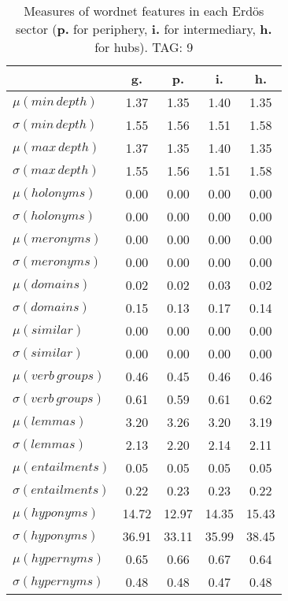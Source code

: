\begin{table}[h!]
\begin{center}
\begin{tabular}{| l | c | c | c | c |}\hline
 & g. & p. & i. & h. \\\hline
$\mu(min\,depth)$ & 1.37  & 1.35  & 1.40  & 1.35 \\\hline
$\sigma(min\,depth)$ & 1.55  & 1.56  & 1.51  & 1.58 \\\hline
$\mu(max\,depth)$ & 1.37  & 1.35  & 1.40  & 1.35 \\\hline
$\sigma(max\,depth)$ & 1.55  & 1.56  & 1.51  & 1.58 \\\hline
$\mu(holonyms)$ & 0.00  & 0.00  & 0.00  & 0.00 \\\hline
$\sigma(holonyms)$ & 0.00  & 0.00  & 0.00  & 0.00 \\\hline
$\mu(meronyms)$ & 0.00  & 0.00  & 0.00  & 0.00 \\\hline
$\sigma(meronyms)$ & 0.00  & 0.00  & 0.00  & 0.00 \\\hline
$\mu(domains)$ & 0.02  & 0.02  & 0.03  & 0.02 \\\hline
$\sigma(domains)$ & 0.15  & 0.13  & 0.17  & 0.14 \\\hline
$\mu(similar)$ & 0.00  & 0.00  & 0.00  & 0.00 \\\hline
$\sigma(similar)$ & 0.00  & 0.00  & 0.00  & 0.00 \\\hline
$\mu(verb\,groups)$ & 0.46  & 0.45  & 0.46  & 0.46 \\\hline
$\sigma(verb\,groups)$ & 0.61  & 0.59  & 0.61  & 0.62 \\\hline
$\mu(lemmas)$ & 3.20  & 3.26  & 3.20  & 3.19 \\\hline
$\sigma(lemmas)$ & 2.13  & 2.20  & 2.14  & 2.11 \\\hline
$\mu(entailments)$ & 0.05  & 0.05  & 0.05  & 0.05 \\\hline
$\sigma(entailments)$ & 0.22  & 0.23  & 0.23  & 0.22 \\\hline
$\mu(hyponyms)$ & 14.72  & 12.97  & 14.35  & 15.43 \\\hline
$\sigma(hyponyms)$ & 36.91  & 33.11  & 35.99  & 38.45 \\\hline
$\mu(hypernyms)$ & 0.65  & 0.66  & 0.67  & 0.64 \\\hline
$\sigma(hypernyms)$ & 0.48  & 0.48  & 0.47  & 0.48 \\\hline
\end{tabular}
\caption{Measures of wordnet features in each Erd\"os sector ({{\bf p.}} for periphery, {{\bf i.}} for intermediary, {{\bf h.}} for hubs). TAG: 9}
\end{center}
\end{table}
